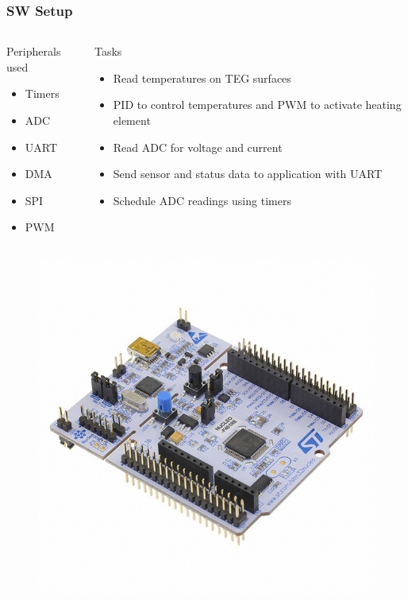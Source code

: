 \begin{frame}
    \frametitle{SW Setup}
\begin{columns}[t] %
        \begin{block}{Peripherals used}
            \begin{itemize}
                \item Timers
                \item ADC
                \item UART
                \item DMA
                \item SPI
                \item PWM
            \end{itemize}
        \end{block}
    \begin{block}{Tasks}
        \begin{itemize}
            \item Read temperatures on TEG surfaces
            \item PID to control temperatures and PWM to activate heating element
            \item Read ADC for voltage and current
            \item Send sensor and status data to application with UART
            \item Schedule ADC readings using timers
        \end{itemize}
    \end{block}
\end{columns}

\begin{figure}
        \centering
        \includegraphics[scale=0.18]{images/nucleo.JPG}
    \end{figure}
\end{frame}

